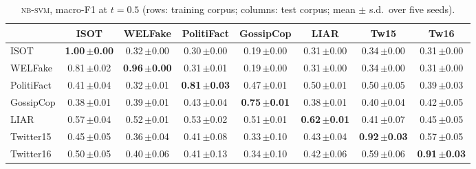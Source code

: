 \begin{table}[h]
\centering
\caption{\textsc{nb-svm}, macro-F1 at $t=0.5$ (rows: training corpus; columns: test corpus; mean $\pm$ s.d.\ over five seeds).}
\scriptsize
\begin{tabular}{@{}lccccccc@{}}
\toprule
 & ISOT & WELFake & PolitiFact & GossipCop & LIAR & Tw15 & Tw16 \\
\midrule
ISOT & \textbf{1.00\,{\tiny$\pm$0.00}} & 0.32\,{\tiny$\pm$0.00} & 0.30\,{\tiny$\pm$0.00} & 0.19\,{\tiny$\pm$0.00} & 0.31\,{\tiny$\pm$0.00} & 0.34\,{\tiny$\pm$0.00} & 0.31\,{\tiny$\pm$0.00} \\
WELFake & 0.81\,{\tiny$\pm$0.02} & \textbf{0.96\,{\tiny$\pm$0.00}} & 0.31\,{\tiny$\pm$0.01} & 0.19\,{\tiny$\pm$0.00} & 0.31\,{\tiny$\pm$0.00} & 0.34\,{\tiny$\pm$0.00} & 0.31\,{\tiny$\pm$0.00} \\
PolitiFact & 0.41\,{\tiny$\pm$0.04} & 0.32\,{\tiny$\pm$0.01} & \textbf{0.81\,{\tiny$\pm$0.03}} & 0.47\,{\tiny$\pm$0.01} & 0.50\,{\tiny$\pm$0.01} & 0.50\,{\tiny$\pm$0.05} & 0.39\,{\tiny$\pm$0.03} \\
GossipCop & 0.38\,{\tiny$\pm$0.01} & 0.39\,{\tiny$\pm$0.01} & 0.43\,{\tiny$\pm$0.04} & \textbf{0.75\,{\tiny$\pm$0.01}} & 0.38\,{\tiny$\pm$0.01} & 0.40\,{\tiny$\pm$0.04} & 0.42\,{\tiny$\pm$0.05} \\
LIAR & 0.57\,{\tiny$\pm$0.04} & 0.52\,{\tiny$\pm$0.01} & 0.53\,{\tiny$\pm$0.02} & 0.51\,{\tiny$\pm$0.01} & \textbf{0.62\,{\tiny$\pm$0.01}} & 0.41\,{\tiny$\pm$0.07} & 0.45\,{\tiny$\pm$0.05} \\
Twitter15 & 0.45\,{\tiny$\pm$0.05} & 0.36\,{\tiny$\pm$0.04} & 0.41\,{\tiny$\pm$0.08} & 0.33\,{\tiny$\pm$0.10} & 0.43\,{\tiny$\pm$0.04} & \textbf{0.92\,{\tiny$\pm$0.03}} & 0.57\,{\tiny$\pm$0.05} \\
Twitter16 & 0.50\,{\tiny$\pm$0.05} & 0.40\,{\tiny$\pm$0.06} & 0.41\,{\tiny$\pm$0.13} & 0.34\,{\tiny$\pm$0.10} & 0.42\,{\tiny$\pm$0.06} & 0.59\,{\tiny$\pm$0.06} & \textbf{0.91\,{\tiny$\pm$0.03}} \\
\bottomrule
\end{tabular}
\end{table}

